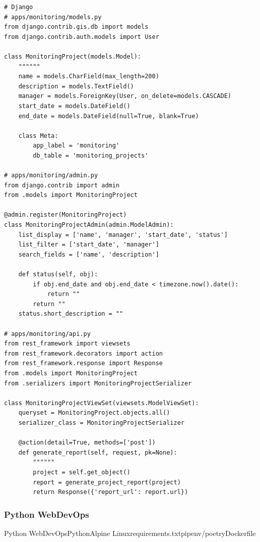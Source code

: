 \begin{lstlisting}[style=python]
# Django
# apps/monitoring/models.py
from django.contrib.gis.db import models
from django.contrib.auth.models import User

class MonitoringProject(models.Model):
    """"""
    name = models.CharField(max_length=200)
    description = models.TextField()
    manager = models.ForeignKey(User, on_delete=models.CASCADE)
    start_date = models.DateField()
    end_date = models.DateField(null=True, blank=True)
    
    class Meta:
        app_label = 'monitoring'
        db_table = 'monitoring_projects'
        
# apps/monitoring/admin.py
from django.contrib import admin
from .models import MonitoringProject

@admin.register(MonitoringProject)
class MonitoringProjectAdmin(admin.ModelAdmin):
    list_display = ['name', 'manager', 'start_date', 'status']
    list_filter = ['start_date', 'manager']
    search_fields = ['name', 'description']
    
    def status(self, obj):
        if obj.end_date and obj.end_date < timezone.now().date():
            return ""
        return ""
    status.short_description = ""

# apps/monitoring/api.py
from rest_framework import viewsets
from rest_framework.decorators import action
from rest_framework.response import Response
from .models import MonitoringProject
from .serializers import MonitoringProjectSerializer

class MonitoringProjectViewSet(viewsets.ModelViewSet):
    queryset = MonitoringProject.objects.all()
    serializer_class = MonitoringProjectSerializer
    
    @action(detail=True, methods=['post'])
    def generate_report(self, request, pk=None):
        """"""
        project = self.get_object()
        report = generate_project_report(project)
        return Response({'report_url': report.url})
\end{lstlisting}

\hypertarget{python-webdevops}{%
\subsubsection{Python WebDevOps}\label{python-webdevops}}

\important{}Python WebDevOps\important{}PythonAlpine
Linux\important{}requirements.txtpipenv/poetry\important{}Dockerfile\important{}

